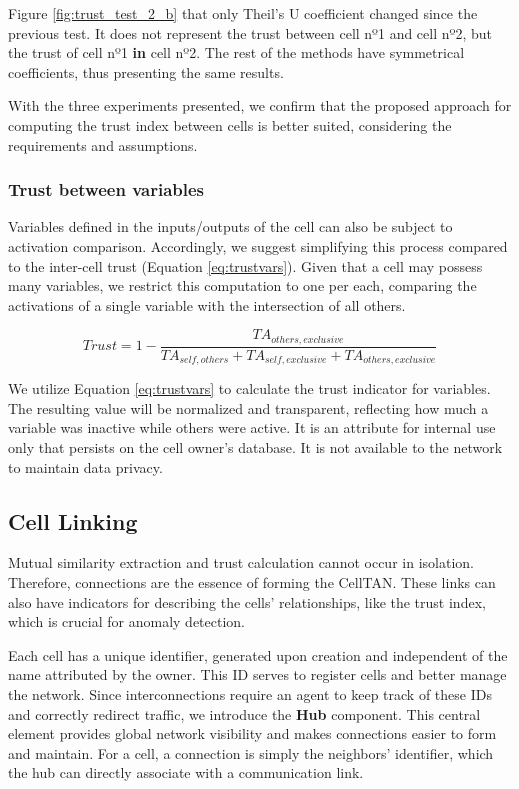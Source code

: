 Figure \ref{fig:trust_test_2_b} that only Theil's U coefficient changed since the previous test. It does not represent the trust between cell nº1 and cell nº2, but the trust of cell nº1 \textbf{in} cell nº2. The rest of the methods have symmetrical coefficients, thus presenting the same results.

With the three experiments presented, we confirm that the proposed approach for computing the trust index between cells is better suited, considering the requirements and assumptions.

\subsubsection{Trust between variables}

Variables defined in the inputs/outputs of the cell can also be subject to activation comparison. Accordingly, we suggest simplifying this process compared to the inter-cell trust (Equation \ref{eq:trustvars}). Given that a cell may possess many variables, we restrict this computation to one per each, comparing the activations of a single variable with the intersection of all others.

\begin{equation} \label{eq:trustvars}
    Trust = 1 - \frac{TA_{others, exclusive}}{TA_{self,others} + TA_{self, exclusive} + TA_{others, exclusive}}
\end{equation}

We utilize Equation \ref{eq:trustvars} to calculate the trust indicator for variables. The resulting value will be normalized and transparent, reflecting how much a variable was inactive while others were active. It is an attribute for internal use only that persists on the cell owner's database. It is not available to the network to maintain data privacy.

\subsection{Cell Linking}

Mutual similarity extraction and trust calculation cannot occur in isolation. Therefore, connections are the essence of forming the CellTAN. These links can also have indicators for describing the cells' relationships, like the trust index, which is crucial for anomaly detection.

Each cell has a unique identifier, generated upon creation and independent of the name attributed by the owner. This ID serves to register cells and better manage the network. Since interconnections require an agent to keep track of these IDs and correctly redirect traffic, we introduce the \textbf{Hub} component. This central element provides global network visibility and makes connections easier to form and maintain. For a cell, a connection is simply the neighbors' identifier, which the hub can directly associate with a communication link.

